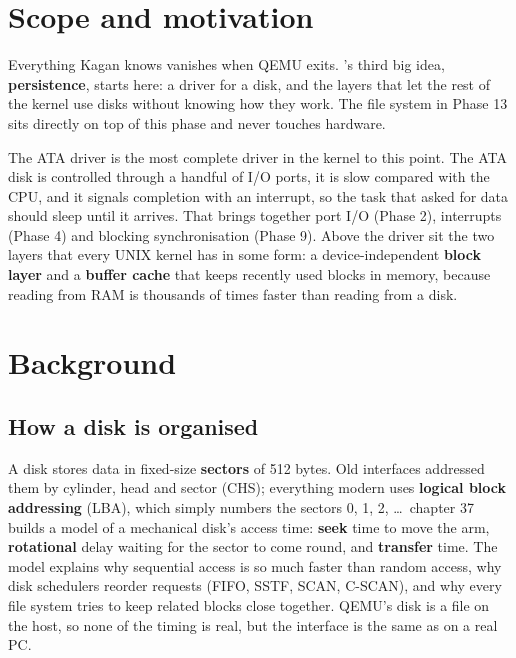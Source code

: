 \documentclass[11pt,a4paper]{article}
\begin{document}


\section{Scope and motivation}

Everything Kagan knows vanishes when QEMU exits. \OSTEP's third big idea, \textbf{persistence}, starts here: a
driver for a disk, and the layers that let the rest of the kernel use disks without knowing how they work. The file
system in Phase 13 sits directly on top of this phase and never touches hardware.

The ATA driver is the most complete driver in the kernel to this point. The ATA disk is controlled through a handful of I/O ports, it is slow
compared with the CPU, and it signals completion with an interrupt, so the task that asked for data should sleep
until it arrives. That brings together port I/O (Phase 2), interrupts (Phase 4) and blocking synchronisation
(Phase 9). Above the driver sit the two layers that every UNIX kernel has in some form: a
device-independent \textbf{block layer} and a \textbf{buffer cache} that keeps recently used blocks in memory, because
reading from RAM is thousands of times faster than reading from a disk.

\section{Background}

\subsection{How a disk is organised}

A disk stores data in fixed-size \textbf{sectors} of 512 bytes. Old interfaces addressed them by cylinder, head and
sector (CHS); everything modern uses \textbf{logical block addressing} (LBA), which simply numbers the sectors 0, 1,
2, \dots\ \OSTEP chapter 37 builds a model of a mechanical disk's access time: \textbf{seek} time to move the arm,
\textbf{rotational} delay waiting for the sector to come round, and \textbf{transfer} time. The model explains why
sequential access is so much faster than random access, why disk schedulers reorder requests (FIFO, SSTF, SCAN,
C-SCAN), and why every file system tries to keep related blocks close together. QEMU's disk is a file on the host,
so none of the timing is real, but the interface is the same as on a real PC.
\end{document}
